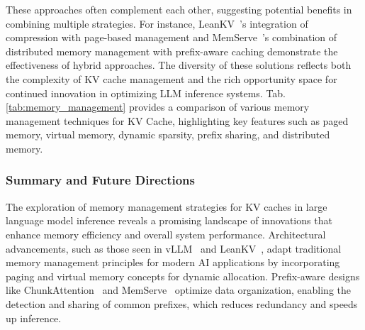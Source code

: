 

These approaches often complement each other, suggesting potential benefits in combining multiple strategies. For instance, LeanKV~\cite{zhang2024unifyingkvcachecompression}'s integration of compression with page-based management and MemServe~\cite{hu2024memservecontextcachingdisaggregated}'s combination of distributed memory management with prefix-aware caching demonstrate the effectiveness of hybrid approaches. The diversity of these solutions reflects both the complexity of KV cache management and the rich opportunity space for continued innovation in optimizing LLM inference systems. Tab.\ref{tab:memory_management} provides a comparison of various memory management techniques for KV Cache, highlighting key features such as paged memory, virtual memory, dynamic sparsity, prefix sharing, and distributed memory.


\subsubsection{Summary and Future Directions} 
The exploration of memory management strategies for KV caches in large language model inference reveals a promising landscape of innovations that enhance memory efficiency and overall system performance. Architectural advancements, such as those seen in vLLM~\cite{DBLP:conf/sosp/KwonLZ0ZY0ZS23} and LeanKV~\cite{zhang2024unifyingkvcachecompression}, adapt traditional memory management principles for modern AI applications by incorporating paging and virtual memory concepts for dynamic allocation. Prefix-aware designs like ChunkAttention~\cite{ye2024chunkattentionefficientselfattentionprefixaware} and MemServe~\cite{hu2024memservecontextcachingdisaggregated} optimize data organization, enabling the detection and sharing of common prefixes, which reduces redundancy and speeds up inference. 

